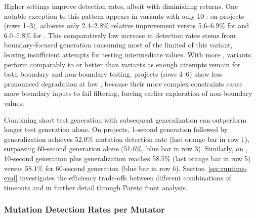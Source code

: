 Higher \tries{} settings improve detection rates, albeit with diminishing returns.
One notable exception to this pattern appears in \VariantImproved{} variants with only 10 \tries{}:
on \DatasetsEqBenchEs{} projects (rows 1--3),
\VariantImprovedA{} achieves only 2.4--2.8\% relative improvement
versus 5.6--6.9\% for \VariantImprovedB{} and 6.0--7.8\% for \VariantImprovedC{}.
This comparatively low increase in detection rates stems from boundary-focused generation
consuming most of the limited \tries{} of this variant,
leaving insufficient attempts for testing intermediate values.
With more \tries{}, \VariantImproved{} variants perform comparably to or better than \VariantNaive{} variants
as enough attempts remain for both boundary and non-boundary testing.
\DatasetsCommonsEs{} projects (rows 4--6) show less pronounced degradation at low \tries{},
because their more complex constraints
cause more boundary inputs to fail filtering,
forcing earlier exploration of non-boundary values.

Combining short test generation with subsequent generalization
can outperform longer test generation alone.
On \DatasetsEqBenchEs{} projects,
1-second \ToolEvoSuite{} generation followed by \VariantNaiveC{} generalization
achieves 52.0\% mutation detection rate (last orange bar in row 1),
surpassing 60-second generation alone (51.6\%, blue bar in row 3).
Similarly, on \DatasetsCommonsEs{},
10-second generation plus \VariantNaiveC{} generalization
reaches 58.5\% (last orange bar in row 5)
versus 58.1\% for 60-second generation (blue bar in row 6).
Section~\ref{sec:runtime-eval} investigates the efficiency trade-offs
between different combinations of \ToolEvoSuite{} timeouts and \ToolTeralizer{} \tries{}
in further detail through Pareto front analysis.

\subsubsection{Mutation Detection Rates per Mutator}%
\label{sec:detection-rates-per-mutator}

